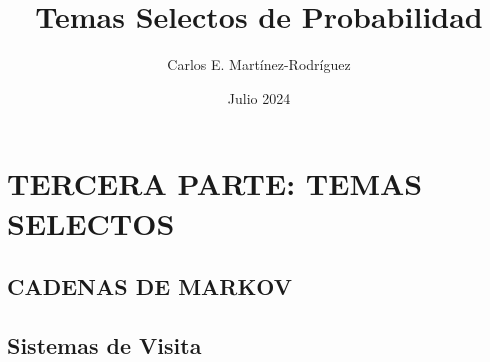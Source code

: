 \documentclass{report}
\title{Temas Selectos de Probabilidad}
\author{Carlos E. Martínez-Rodríguez}
\date{Julio 2024}
\begin{document}
\maketitle

\tableofcontents

\part{TERCERA PARTE: TEMAS SELECTOS}

%
%
%
%
%
%
%
\chapter{CADENAS DE MARKOV}


\chapter{Sistemas de Visita}

%
%
\end{document}
